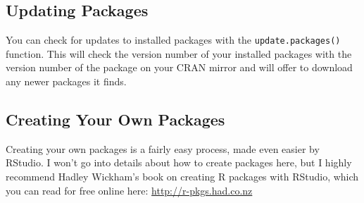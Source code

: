 \documentclass[12pt, oneside]{amsart}   	%
\begin{document}
\subsection{Updating Packages}

You can check for updates to installed packages with the \texttt{update.packages()} function. This will check the version number of your installed packages with the version number of the package on your CRAN mirror and will offer to download any newer packages it finds. 

\subsection{Creating Your Own Packages}

Creating your own packages is a fairly easy process, made even easier by RStudio. I won't go into details about how to create packages here, but I highly recommend Hadley Wickham's book on creating R packages with RStudio, which you can read for free online here: \url{http://r-pkgs.had.co.nz}
\end{document}
